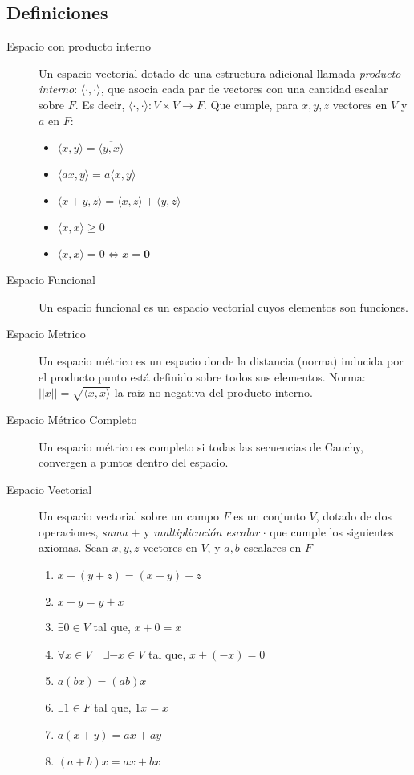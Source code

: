 \documentclass[../../Main/Main.tex]{subfiles}
\begin{document}
\subsection{Definiciones}
\begin{description}

	\item[Espacio con producto interno] Un espacio vectorial dotado de una estructura adicional llamada \textit{producto interno}: $\langle \cdot, \cdot \rangle$, que asocia cada par de vectores con una cantidad escalar sobre $F$. Es decir, $\langle \cdot, \cdot \rangle : V \times V \to F$. Que cumple, para $x,y,z$ vectores en $V$ y $a$ en $F$:	
	\begin{itemize}
		\item $\langle x,y\rangle =\overline{\langle y,x\rangle}$
		\item $\langle ax,y\rangle = a \langle x,y\rangle$
		\item $\langle x+y,z\rangle = \langle x,z\rangle + \langle y,z\rangle$
		\item $\langle x,x\rangle \geq 0 $ 
		\item $\langle x,x\rangle = 0 \Leftrightarrow x = \mathbf{0}$
	\end{itemize}

	\item[Espacio Funcional] Un espacio funcional es un espacio vectorial cuyos elementos son funciones.

	\item[Espacio Metrico] Un espacio métrico es un espacio donde la distancia (norma) inducida por el producto punto está definido sobre todos sus elementos. Norma: $||x|| = \sqrt{\langle x,x\rangle}$ la raiz no negativa del producto interno.
	
	\item[Espacio Métrico Completo] Un espacio métrico es completo si todas las secuencias de Cauchy, convergen a puntos dentro del espacio.  
	
	\item[Espacio Vectorial] Un espacio vectorial sobre un campo $F$ es un conjunto $V$, dotado de dos operaciones, \textit{suma} $+$ y \textit{multiplicación escalar} $\cdot$ que cumple los siguientes axiomas. Sean $x,y,z$ vectores en $V$, y $a,b$ escalares en $F$
	\begin{enumerate}
		\item $x+(y+z) = (x + y) + z$
		\item $x + y = y + x$
		\item $\exists 0 \in V$ tal que, $x + 0 = x$
		\item $\forall x \in V\quad \exists -x \in V$ tal que, $x + (-x) = 0$
		\item $a(bx) = (ab)x$ 
		\item $\exists 1 \in F$ tal que, $1x = x$
		\item $a(x+y) = ax + ay$
		\item $(a+b)x = ax + bx$
	\end{enumerate}	


\end{description}
\end{document}
